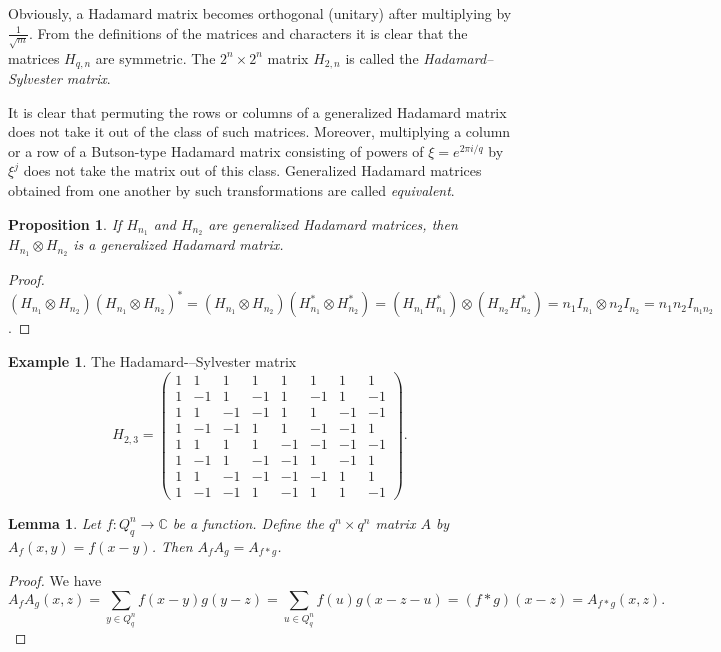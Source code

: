 \documentclass[11pt]{article}
\newtheorem{claim}{Proposition}[section]
\newtheorem{lemma}{Lemma}[section]
\theoremstyle{definition}
\newtheorem{example}{Example}[section]
\begin{document}
{{{Obviously, a Hadamard matrix becomes orthogonal (unitary) after multiplying by $\frac{1}{\sqrt m}$. From the definitions of the matrices and characters it is clear that the matrices $H_{q,n}$ are symmetric.
The $2^n\times 2^n$ matrix $H_{2,n}$ is called the {\sl Hadamard--Sylvester matrix}.

It is clear that permuting the rows or columns of a generalized Hadamard matrix does not take it out of the class of such matrices. Moreover, multiplying a column or a row of a Butson-type Hadamard matrix consisting of powers of $\xi=e^{2\pi i/q}$ by $\xi^j$ does not take the matrix out of this class.
Generalized Hadamard matrices obtained from one another by such transformations are called {\sl equivalent}.

\begin{claim}
If $H_{n_1}$ and $H_{n_2}$ are generalized Hadamard matrices, then $H_{n_1}\otimes H_{n_2}$ is a generalized Hadamard matrix.
\end{claim}
\begin{proof}
$(H_{n_1}\otimes H_{n_2})(H_{n_1}\otimes H_{n_2})^*=(H_{n_1}\otimes
H_{n_2})(H^*_{n_1}\otimes H^*_{n_2})= (H_{n_1}H_{n_1}^*)\otimes
(H_{n_2}H_{n_2}^*)=n_1I_{n_1}\otimes n_2I_{n_2}=n_1n_2I_{n_1n_2}$.
\end{proof}

\begin{example}
The Hadamard-–Sylvester matrix
 $$H_{2,3}=\begin{pmatrix}
1& 1& 1 &1 &1 &1 &1 & 1\\
1 &-1 &1 &-1 &1 &-1 &1 &-1 \\
1 & 1& -1 &-1 &1 & 1& -1& -1 \\
1 &-1 &-1 &1 &1 &-1 &-1 &1\\
1& 1& 1 &1 &-1 &-1 &-1 & -1\\
1 &-1 &1 &-1 &-1 &1 &-1 &1 \\
1 & 1& -1 &-1 &-1 & -1& 1& 1 \\
1 &-1 &-1 &1    &-1 &1 &1 &-1
\end{pmatrix}.$$
\end{example}


\begin{lemma}\label{l:matrix}
Let $f: Q^n_q\rightarrow \mathbb{C}$ be a function.
Define the $q^n\times q^n$ matrix $A$ by 
$A_f(x,y)=f(x-y)$. Then $A_fA_g=A_{f*g}$.
\end{lemma}
\begin{proof}
We have  $$A_fA_g(x,z)=\sum\limits_{y\in
Q^n_q}f(x-y){g(y-z)}= \sum\limits_{u\in
Q^n_q}f(u)g(x-z-u)=(f*g)(x-z)=A_{f*{g}}(x,z).$$
\end{proof}



}}}
\end{document}
